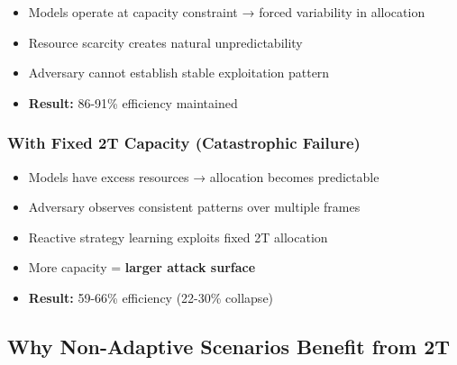 \documentclass[11pt,a4paper]{article}
\newcommand{\critical}[1]{\textcolor{criticalcolor}{\textbf{#1}}}
\begin{document}
\vspace{-0.2cm}
\begin{itemize}
    \vspace{-0.2cm}
    \item Models operate at capacity constraint → forced variability in allocation
    \vspace{-0.2cm}
    \item Resource scarcity creates natural unpredictability
    \vspace{-0.2cm}
    \item Adversary cannot establish stable exploitation pattern
    \vspace{-0.2cm}
    \item \textbf{Result:} 86-91\% efficiency maintained
\end{itemize}

\subsubsection{With Fixed 2T Capacity (Catastrophic Failure)}

\vspace{-0.2cm}
\begin{itemize}
    \vspace{-0.2cm}
    \item Models have excess resources → allocation becomes predictable
    \vspace{-0.2cm}
    \item Adversary observes consistent patterns over multiple frames
    \vspace{-0.2cm}
    \item Reactive strategy learning exploits fixed 2T allocation
    \vspace{-0.2cm}
    \item More capacity = \critical{larger attack surface}
    \vspace{-0.2cm}
    \item \textbf{Result:} 59-66\% efficiency (22-30\% collapse)
\end{itemize}

\subsection{Why Non-Adaptive Scenarios Benefit from 2T}
\end{document}
